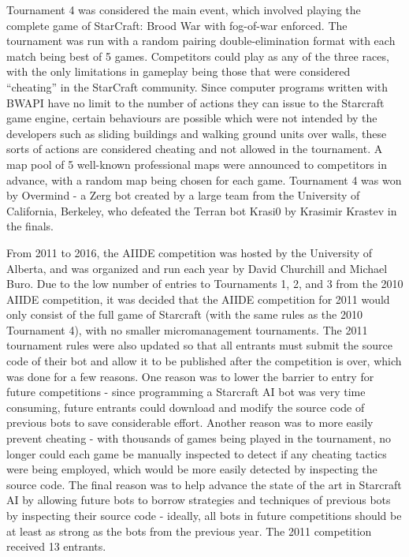 Tournament 4 was considered the main event, which involved playing the complete game of StarCraft: Brood War with fog-of-war enforced. The tournament was run with a random pairing double-elimination format with each match being best of 5 games. Competitors could play as any of the three races, with the only limitations in gameplay being those that were considered ``cheating'' in the StarCraft community. Since computer programs written with BWAPI have no limit to the number of actions they can issue to the Starcraft game engine, certain behaviours are possible which were not intended by the developers such as sliding buildings and walking ground units over walls, these sorts of actions are considered cheating and not allowed in the tournament. A map pool of 5 well-known professional maps were announced to competitors in advance, with a random map being chosen for each game. Tournament 4 was won by Overmind - a Zerg bot created by a large team from the University of California, Berkeley, who defeated the Terran bot Krasi0 by Krasimir Krastev in the finals.

From 2011 to 2016, the AIIDE competition was hosted by the University of Alberta, and was organized and run each year by David Churchill and Michael Buro. Due to the low number of entries to Tournaments 1, 2, and 3 from the 2010 AIIDE competition, it was decided that the AIIDE competition for 2011 would only consist of the full game of Starcraft (with the same rules as the 2010 Tournament 4), with no smaller micromanagement tournaments. The 2011 tournament rules were also updated so that all entrants must submit the source code of their bot and allow it to be published after the competition is over, which was done for a few reasons. One reason was to lower the barrier to entry for future competitions - since programming a Starcraft AI bot was very time consuming, future entrants could download and modify the source code of previous bots to save considerable effort. Another reason was to more easily prevent cheating - with thousands of games being played in the tournament, no longer could each game be manually inspected to detect if any cheating tactics were being employed, which would be more easily detected by inspecting the source code. The final reason was to help advance the state of the art in Starcraft AI by allowing future bots to borrow strategies and techniques of previous bots by inspecting their source code - ideally, all bots in future competitions should be at least as strong as the bots from the previous year. The 2011 competition received 13 entrants. 

